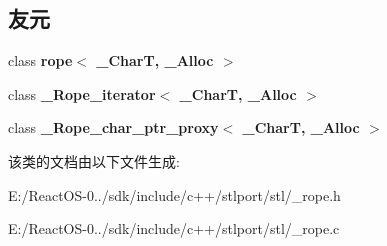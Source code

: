 \subsection*{友元}
\begin{DoxyCompactItemize}
\item 
\mbox{\label{class___rope__char__ref__proxy_a00faa722d619490e42c85e81ecdeba5e}} 
class {\bfseries rope$<$ \+\_\+\+Char\+T, \+\_\+\+Alloc $>$}
\item 
\mbox{\label{class___rope__char__ref__proxy_a5825d72aa563565af5d7520068cccda0}} 
class {\bfseries \+\_\+\+Rope\+\_\+iterator$<$ \+\_\+\+Char\+T, \+\_\+\+Alloc $>$}
\item 
\mbox{\label{class___rope__char__ref__proxy_ae1cd406d49c74f72ff2f3867d07dc465}} 
class {\bfseries \+\_\+\+Rope\+\_\+char\+\_\+ptr\+\_\+proxy$<$ \+\_\+\+Char\+T, \+\_\+\+Alloc $>$}
\end{DoxyCompactItemize}


该类的文档由以下文件生成\+:\begin{DoxyCompactItemize}
\item 
E\+:/\+React\+O\+S-\/0../sdk/include/c++/stlport/stl/\+\_\+rope.\+h\item 
E\+:/\+React\+O\+S-\/0../sdk/include/c++/stlport/stl/\+\_\+rope.\+c\end{DoxyCompactItemize}
